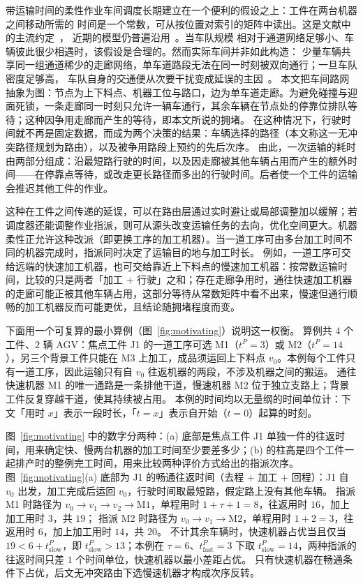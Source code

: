 \documentclass[manuscript,screen,review]{acmart}
\begin{document}
带运输时间的柔性作业车间调度长期建立在一个便利的假设之上：工件在两台机器之间移动所需的
时间是一个常数，可从按位置对索引的矩阵中读出。这是文献中的主流约定~\cite{xin2025review}，
近期的模型仍普遍沿用~\cite{meng2025cp,qin2026knowledge,jafarian2026integrated}。当车队规模
相对于通道网络足够小、车辆彼此很少相遇时，该假设是合理的。然而实际车间并非如此构造：
少量车辆共享同一组通道稀少的走廊网络，单车道路段无法在同一时刻被双向通行；一旦车队密度足够高，
车队自身的交通便从次要干扰变成延误的主因~\cite{kim2026congestion}。
本文把车间路网抽象为图：节点为上下料点、机器工位与路口，边为单车道走廊。为避免碰撞与迎面死锁，一条走廊同一时刻只允许一辆车通行，其余车辆在节点处的停靠位排队等待；这种因争用走廊而产生的等待，即本文所说的拥堵。
在这种情况下，行驶时间就不再是固定数据，而成为两个决策的结果：车辆选择的路径（本文称这一无冲突路径规划为路由），以及被争用路段上预约的先后次序。
由此，一次运输的耗时由两部分组成：沿最短路行驶的时间，以及因走廊被其他车辆占用而产生的额外时间——在停靠点等待，或改走更长路径而多出的行驶时间。后者使一个工件的运输会推迟其他工件的作业。

这种在工件之间传递的延误，可以在路由层通过实时避让或局部调整加以缓解；若调度器还能调整作业指派，则可从源头改变运输任务的去向，优化空间更大。机器柔性正允许这种改派（即更换工序的加工机器）。当一道工序可由多台加工时间不同的机器完成时，指派同时决定了运输目的地与加工时长。
例如，一道工序可交给远端的快速加工机器，也可交给靠近上下料点的慢速加工机器：按常数运输时间，比较的只是两者「加工 $+$ 行驶」之和；存在走廊争用时，通往快速加工机器的走廊可能正被其他车辆占用，这部分等待从常数矩阵中看不出来，慢速但通行顺畅的加工机器反而可能更优，且结论随拥堵程度而变。

下面用一个可复算的最小算例（图~\ref{fig:motivating}）说明这一权衡。
算例共 $4$ 个工件、$2$ 辆 AGV：焦点工件 J1 的一道工序可选 M1（$t^P=3$）或 M2（$t^P=14$），另三个背景工件只能在 M3 上加工，成品须运回上下料点 $v_0$。本例每个工件只有一道工序，因此运输只有自 $v_0$ 往返机器的两段，不涉及机器之间的搬运。
通往快速机器 M1 的唯一通路是一条排他干道，慢速机器 M2 位于独立支路上；背景工件反复穿越干道，使其持续被占用。
本例的时间均以无量纲的时间单位计：下文「用时 $x$」表示一段时长，「$t=x$」表示自开始（$t=0$）起算的时刻。

图~\ref{fig:motivating} 中的数字分两种：(a) 底部是焦点工件 J1 单独一件的往返时间，用来确定快、慢两台机器的加工时间至少要差多少；(b) 的柱高是四个工件一起排产时的整例完工时间，用来比较两种评价方式给出的指派次序。
图~\ref{fig:motivating}(a) 底部为 J1 的畅通往返时间（去程 + 加工 + 回程）：J1 自 $v_0$ 出发，加工完成后运回 $v_0$，行驶时间取最短路，假定路上没有其他车辆。
指派 M1 时路径为 $v_0\to v_1\to v_2\to\mathrm{M1}$，单程用时 $1+\tau+1=8$，往返用时 $16$，加上加工用时 $3$，共 $19$；
指派 M2 时路径为 $v_0\to v_1\to\mathrm{M2}$，单程用时 $1+2=3$，往返用时 $6$，加上加工用时 $14$，共 $20$。
不计其余车辆时，快速机器占优当且仅当 $19<6+t^P_{\text{slow}}$，即 $t^P_{\text{slow}}>13$；本例在 $\tau=6$、$t^P_{\text{fast}}=3$ 下取 $t^P_{\text{slow}}=14$，两种指派的往返时间只差 $1$ 个时间单位，快速机器以最小差距占优。
只有快速机器在畅通条件下占优，后文无冲突路由下选慢速机器才构成次序反转。
\end{document}

